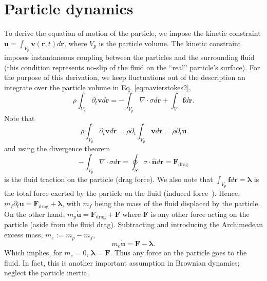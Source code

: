 \documentclass[twoside,openright,titlepage,numbers=noenddot,%
headinclude,footinclude,cleardoublepage=empty,abstract=on,
BCOR=5mm,fontsize=11pt, dvipsnames, paper=b5
]{scrreprt}
\renewcommand{\vec}[1]{\bm{#1}}
\newcommand{\tens}[1]{\bm{\mathcal{#1}}}
\newcommand{\pvel}{u}
\newcommand{\fpos}{r}
\newcommand{\fvel}{v}
\begin{document}
\section*{Particle dynamics}
To derive the equation of motion of the particle, we impose the kinetic constraint $\vec{u} = \int_{V_p}\vec{\fvel}(\vec{\fpos}, t)d\vec{\fpos}$, where $V_p$ is the particle volume. The kinetic constraint imposes instantaneous coupling between the particles and the surrounding fluid (this condition represents no-slip of the fluid on the ``real'' particle's surface). For the purpose of this derivation, we keep fluctuations out of the description an integrate over the particle volume in Eq. \eqref{eq:navierstokes2},
\begin{equation}
  \rho\int_{V_p}\partial_t\vec{\fvel}d\vec{\fpos} = -\int_{V_p}\nabla\cdot\tens{\sigma}d\vec{r} + \int_V\vec{f}d\vec{\fpos}.
\end{equation}
Note that
$$\rho\int_{V_p}\partial_t\vec{\fvel}d\vec{\fpos} = \rho \partial_t\int_{V_p}\vec{\fvel}d\vec{\fpos} = \rho\partial_t\vec{\pvel}$$
and using the divergence theorem
$$
-\int_{V_p}\nabla\cdot\tens{\sigma}d\vec{\fpos} = \oint_S\tens{\sigma}\cdot\hat{\vec{n}}d\vec{r} = \vec{F}_{\text{drag}}
$$
is the fluid traction on the particle (drag force).
We also note that $\int_{V_p}\vec{f}d\vec{\fpos} = \vec{\lambda}$ is the total force exerted by the particle on the fluid (induced force~\cite{Mazur1974}).
Hence, $m_f\partial_t\vec{\pvel} = \vec{F}_{\text{drag}} + \vec{\lambda}$, with $m_f$ being the mass of the fluid displaced by the particle.
On the other hand, $m_p\dot{\vec{\pvel}} = \vec{F}_{\text{drag}} + \vec{F}$ where $\vec{F}$ is any other force acting on the particle (aside from the fluid drag). Subtracting and introducing the Archimedean excess mass,  $m_e := m_p - m_f$,
\begin{equation}
  m_e\dot{\vec{\pvel}} = \vec{F} - \vec{\lambda}.
\end{equation}
Which implies, for $m_e = 0$, $\vec{\lambda}=\vec{F}$. Thus any force on the particle goes to the fluid. In fact, this is another important assumption in Brownian dynamics; neglect the particle inertia.
\end{document}
